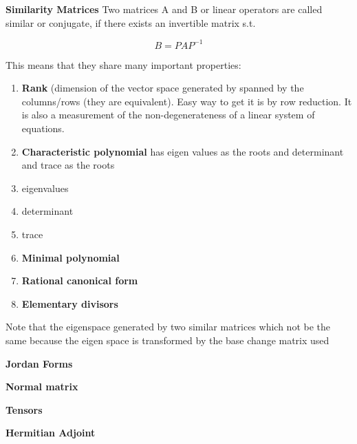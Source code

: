 \documentclass{article}
\begin{document}
\setlength{\parindent}{0pt}

\textbf{Similarity Matrices}
\vspace{5mm}
Two matrices A and B or linear operators are called similar or conjugate, if there exists an invertible matrix s.t.

\begin{equation}
B=PAP^{-1}
\end{equation}

This means that they share many important properties:

\begin{enumerate}
\item \textbf{Rank} (dimension of the vector space generated by spanned by the columns/rows (they are equivalent). Easy way to get it is by row reduction. It is also a measurement of the non-degenerateness of a linear system of equations. 
\item \textbf{Characteristic polynomial} has eigen values as the roots and determinant and trace as the roots
\item eigenvalues
\item determinant
\item trace
\item \textbf{Minimal polynomial}
\item \textbf{Rational canonical form}
\item \textbf{Elementary divisors}


\end{enumerate}

Note that the eigenspace generated by two similar matrices which not be the same because the eigen space is transformed by the base change matrix used



\textbf{Jordan Forms}



\textbf{Normal matrix}


\textbf{Tensors}


\textbf{Hermitian Adjoint}
\end{document}

